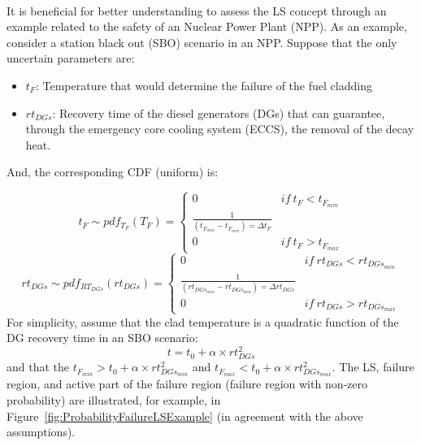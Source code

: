 \\It is beneficial for better understanding to assess the LS concept through an example related to the safety of an Nuclear Power Plant (NPP).
As an example, consider a station black out (SBO) scenario in an NPP. Suppose that the only uncertain parameters are:
\begin{itemize}
  \item $t_{F}$: Temperature that would determine the failure of the fuel cladding
  \item $rt_{DGs}$: Recovery time of the diesel generators (DGs) that 
  can guarantee, through the emergency core cooling system (ECCS), 
  the removal of the decay heat.
\end{itemize}
And, the corresponding CDF (uniform) is:

\begin{equation}
t_{F}\sim pdf_{T_{F}}\left ( T_{F} \right )=\left\{\begin{matrix}
0 & if \: t_{F}< t_{F_{min}} \\ 
\frac{1}{\left ( t_{F_{max}}- t_{F_{min}} \right )=\Delta t_{F}} & \\ 
0 & if \: t_{F}>  t_{F_{max}} 
\end{matrix}\right.
\end{equation}
%
%
\begin{equation}
rt_{DGs}\sim pdf_{RT_{DGs}}\left ( rt_{DGs} \right )=\left\{\begin{matrix}
0 & if \: rt_{DGs}<rt_{DGs_{min}}   \\ 
\frac{1}{\left ( rt_{DGs_{max}} - rt_{DGs_{min}} \right )=\Delta rt_{DGs}} & \\ 
0 & if \: rt_{DGs}>rt_{DGs_{max}} 
\end{matrix}\right.
\end{equation}
For simplicity, assume that the clad temperature is a quadratic function of the DG recovery time in an SBO scenario:
\begin{equation}
  t = t_{0}+\alpha \times rt_{DGs}^{2}
\end{equation}
and that the  $ t_{F_{min}} > t_{0}+\alpha \times rt_{DGs_{min}}^{2}$
and $t_{F_{max}} < t_{0}+\alpha \times rt_{DGs_{max}}^{2}$.
The LS, failure region, and active part of the failure region (failure region with non-zero probability) are illustrated, for example, in Figure~\ref{fig:ProbabilityFailureLSExample} (in agreement with the above assumptions).
